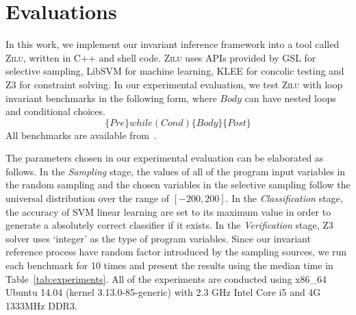 
\section{Evaluations} %
\label{sec:evaluations}

In this work, we implement our invariant inference framework into a tool called \textsc{Zilu}, 
written in C++ and shell code. 
\textsc{Zilu} uses APIs provided by GSL for selective sampling, LibSVM for machine learning, 
KLEE for concolic testing and Z3 for constraint solving. 
In our experimental evaluation, 
we test \textsc{Zilu} with  loop invariant benchmarks 
in the following form, where $\mathit{Body}$ can have nested loops and conditional choices. 
\[
    \{ \mathit{Pre} \} \mathit{while}(\mathit{Cond}) \{ \mathit{Body} \} \{ \mathit{Post} \}
\]
All benchmarks are available from~\cite{zilu}. 

The parameters chosen in our experimental evaluation can be elaborated as follows. 
In the \emph{Sampling} stage, 
the values of all of the program input variables in the random sampling 
and the chosen variables in the selective sampling 
follow the universal distribution over the range of $[-200, 200]$. 
In the \emph{Classification} stage, 
the accuracy of SVM linear learning are set to its maximum value 
in order to generate a absolutely correct classifier if it exists. 
In the \emph{Verification} stage, 
Z3 solver uses `integer' as the type of program variables. 
Since our invariant reference process have random factor 
introduced by the sampling sources, 
we run each benchmark for 10 times 
and present the results using the median time in Table~\ref{tab:experiments}. 
All of the experiments are conducted using x86\_64 Ubuntu 14.04 (kernel 3.13.0-85-generic) 
with 2.3 GHz Intel Core i5 and 4G 1333MHz DDR3. 

